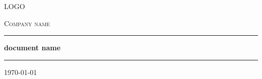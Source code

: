 \documentclass[a4paper,headsepline]{report}
\newcommand{\myRule}[3][black]{\textcolor{#1}{\rule{#2}{#3}}}
\begin{document}
\begin{titlepage}
    \centering
    LOGO
    {\scshape\LARGE Company name \par}
    \vspace{1.5cm}
    \myRule[cargosoft]{8cm}{0.4pt} \par
    \vspace{0.5cm}
    {\huge\bfseries document name\par}
    \vspace{0.5cm}
    \myRule[cargosoft]{8cm}{0.4pt} \par
    \vspace{2cm}
    \vfill
    {\large \today\par}
\end{titlepage}

\Blindtext

\cleardoublepage
{}
\recalctypearea
{}
\Blindtext
\end{document}
